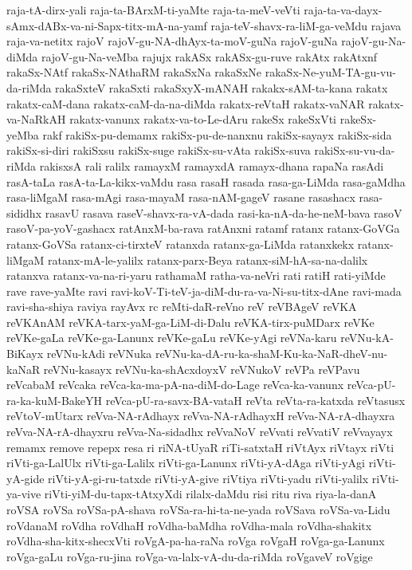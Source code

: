 {raja-tA-dirx-yali
raja-ta-BArxM-ti-yaMte
raja-ta-meV-veVti
raja-ta-va-dayx-sAmx-dABx-va-ni-Sapx-titx-mA-na-yamf
raja-teV-shavx-ra-liM-ga-veMdu
rajava
raja-va-netitx
rajoV
rajoV-gu-NA-dhAyx-ta-moV-guNa
rajoV-guNa
rajoV-gu-Na-diMda
rajoV-gu-Na-veMba
rajujx
rakASx
rakASx-gu-ruve
rakAtx
rakAtxnf
rakaSx-NAtf
rakaSx-NAthaRM
rakaSxNa
rakaSxNe
rakaSx-Ne-yuM-TA-gu-vu-da-riMda
rakaSxteV
rakaSxti
rakaSxyX-mANAH
rakakx-sAM-ta-kana
rakatx
rakatx-caM-dana
rakatx-caM-da-na-diMda
rakatx-reVtaH
rakatx-vaNAR
rakatx-va-NaRkAH
rakatx-vanunx
rakatx-va-to-Le-dAru
rakeSx
rakeSxVti
rakeSx-yeMba
rakf
rakiSx-pu-demamx
rakiSx-pu-de-nanxnu
rakiSx-sayayx
rakiSx-sida
rakiSx-si-diri
rakiSxsu
rakiSx-suge
rakiSx-su-vAta
rakiSx-suva
rakiSx-su-vu-da-riMda
rakisxsA
rali
ralilx
ramayxM
ramayxdA
ramayx-dhana
rapaNa
rasAdi
rasA-taLa
rasA-ta-La-kikx-vaMdu
rasa
rasaH
rasada
rasa-ga-LiMda
rasa-gaMdha
rasa-liMgaM
rasa-mAgi
rasa-mayaM
rasa-nAM-gageV
rasane
rasashacx
rasa-sididhx
rasavU
rasava
raseV-shavx-ra-vA-dada
rasi-ka-nA-da-he-neM-bava
rasoV
rasoV-pa-yoV-gashacx
ratAnxM-ba-rava
ratAnxni
ratamf
ratanx
ratanx-GoVGa
ratanx-GoVSa
ratanx-ci-tirxteV
ratanxda
ratanx-ga-LiMda
ratanxkekx
ratanx-liMgaM
ratanx-mA-le-yalilx
ratanx-parx-Beya
ratanx-siM-hA-sa-na-dalilx
ratanxva
ratanx-va-na-ri-yaru
rathamaM
ratha-va-neVri
rati
ratiH
rati-yiMde
rave
rave-yaMte
ravi
ravi-koV-Ti-teV-ja-diM-du-ra-va-Ni-su-titx-dAne
ravi-mada
ravi-sha-shiya
raviya
rayAvx
rc
reMti-daR-reVno
reV
reVBAgeV
reVKA
reVKAnAM
reVKA-tarx-yaM-ga-LiM-di-Dalu
reVKA-tirx-puMDarx
reVKe
reVKe-gaLa
reVKe-ga-Lanunx
reVKe-gaLu
reVKe-yAgi
reVNa-karu
reVNu-kA-BiKayx
reVNu-kAdi
reVNuka
reVNu-ka-dA-ru-ka-shaM-Ku-ka-NaR-dheV-nu-kaNaR
reVNu-kasayx
reVNu-ka-shAcxdoyxV
reVNukoV
reVPa
reVPavu
reVcabaM
reVcaka
reVca-ka-ma-pA-na-diM-do-Lage
reVca-ka-vanunx
reVca-pU-ra-ka-kuM-BakeYH
reVca-pU-ra-savx-BA-vataH
reVta
reVta-ra-katxda
reVtasusx
reVtoV-mUtarx
reVva-NA-rAdhayx
reVva-NA-rAdhayxH
reVva-NA-rA-dhayxra
reVva-NA-rA-dhayxru
reVva-Na-sidadhx
reVvaNoV
reVvati
reVvatiV
reVvayayx
remamx
remove
repepx
resa
ri
riNA-tUyaR
riTi-satxtaH
riVtAyx
riVtayx
riVti
riVti-ga-LalUlx
riVti-ga-Lalilx
riVti-ga-Lanunx
riVti-yA-dAga
riVti-yAgi
riVti-yA-gide
riVti-yA-gi-ru-tatxde
riVti-yA-give
riVtiya
riVti-yadu
riVti-yalilx
riVti-ya-vive
riVti-yiM-du-tapx-tAtxyXdi
rilalx-daMdu
risi
ritu
riva
riya-la-danA
roVSA
roVSa
roVSa-pA-shava
roVSa-ra-hi-ta-ne-yada
roVSava
roVSa-va-Lidu
roVdanaM
roVdha
roVdhaH
roVdha-baMdha
roVdha-mala
roVdha-shakitx
roVdha-sha-kitx-shecxVti
roVgA-pa-ha-raNa
roVga
roVgaH
roVga-ga-Lanunx
roVga-gaLu
roVga-ru-jina
roVga-va-lalx-vA-du-da-riMda
roVgaveV
roVgige
}
